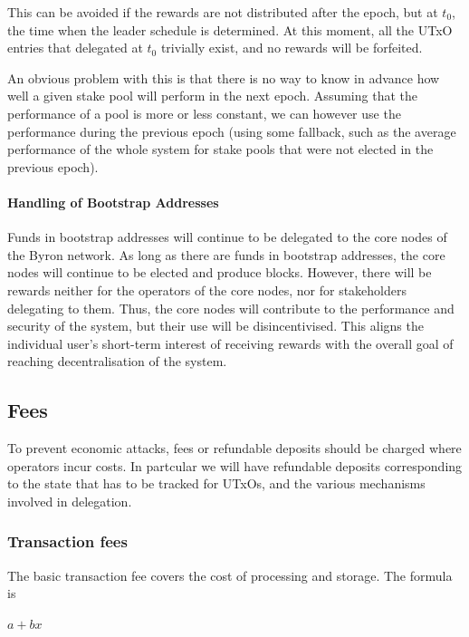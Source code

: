 \documentclass[11pt,a4paper]{article}
\begin{document}
This can be avoided if the rewards are not distributed after the epoch,
but at \(t_0\), the time when the leader schedule is determined. At this
moment, all the UTxO entries that delegated at \(t_0\) trivially exist,
and no rewards will be forfeited.

An obvious problem with this is that there is no way to know in advance
how well a given stake pool will perform in the next epoch. Assuming
that the performance of a pool is more or less constant, we can however
use the performance during the previous epoch (using some fallback, such
as the average performance of the whole system for stake pools that were
not elected in the previous epoch).

\paragraph{Handling of Bootstrap
Addresses}\label{handling-of-bootstrap-addresses}

Funds in bootstrap addresses will continue to be delegated to the core
nodes of the Byron network. As long as there are funds in bootstrap
addresses, the core nodes will continue to be elected and produce
blocks. However, there will be rewards neither for the operators of the
core nodes, nor for stakeholders delegating to them. Thus, the core
nodes will contribute to the performance and security of the system, but
their use will be disincentivised. This aligns the individual user's
short-term interest of receiving rewards with the overall goal of
reaching decentralisation of the system.

\subsection{Fees}\label{fees}

To prevent economic attacks, fees or refundable deposits should be
charged where operators incur costs. In partcular we will have
refundable deposits corresponding to the state that has to be tracked
for UTxOs, and the various mechanisms involved in delegation.

\subsubsection{Transaction fees}\label{transaction-fees}

The basic transaction fee covers the cost of processing and storage. The
formula is

\(a + b x\)
\end{document}
